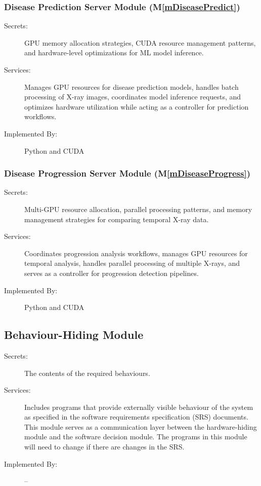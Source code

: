 \documentclass[12pt, titlepage]{article}
\newcommand{\mref}[1]{M\ref{#1}}
\begin{document}
\subsubsection{Disease Prediction Server Module (\mref{mDiseasePredict})}
\begin{description}
\item[Secrets:] GPU memory allocation strategies, CUDA resource management patterns, and hardware-level optimizations for ML model inference.
\item[Services:] Manages GPU resources for disease prediction models, handles batch processing of X-ray images, coordinates model inference requests, and optimizes hardware utilization while acting as a controller for prediction workflows.
\item[Implemented By:] Python and CUDA
\end{description}
\subsubsection{Disease Progression Server Module (\mref{mDiseaseProgress})}
\begin{description}
\item[Secrets:] Multi-GPU resource allocation, parallel processing patterns, and memory management strategies for comparing temporal X-ray data.
\item[Services:] Coordinates progression analysis workflows, manages GPU resources for temporal analysis, handles parallel processing of multiple X-rays, and serves as a controller for progression detection pipelines.
\item[Implemented By:] Python and CUDA
\end{description}

\subsection{Behaviour-Hiding Module}

\begin{description}
\item[Secrets:]The contents of the required behaviours.
\item[Services:]Includes programs that provide externally visible behaviour of
  the system as specified in the software requirements specification (SRS)
  documents. This module serves as a communication layer between the
  hardware-hiding module and the software decision module. The programs in this
  module will need to change if there are changes in the SRS.
\item[Implemented By:] --
\end{description}
\end{document}
